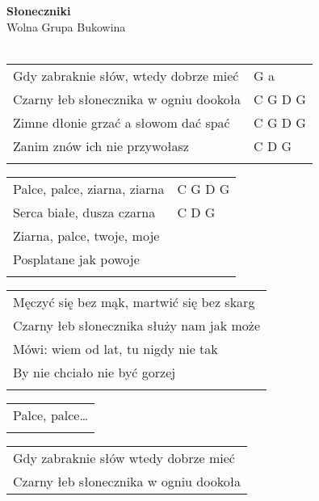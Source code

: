 \documentclass[a5paper]{article}
\begin{document}


\noindent
\fontsize{12pt}{15pt}\selectfont
\textbf{Słoneczniki} \\
\fontsize{8pt}{10pt}\selectfont
Wolna Grupa Bukowina \\ \\
\fontsize{10pt}{12pt}\selectfont
{}
\begin{tabular}{@{}p{8.00cm}p{3cm}@{}}
\noindent
Gdy zabraknie słów, wtedy dobrze mieć & G a \\
Czarny łeb słonecznika w ogniu dookoła & C G D G \\
Zimne dłonie grzać a słowom dać spać	 & C G D G \\
Zanim znów ich nie przywołasz			& C D G \\ \\
\end{tabular}

\noindent
\begin{tabular}{@{}p{7.00cm}p{3cm}@{}}
Palce, palce, ziarna, ziarna & C G D G \\
Serca białe, dusza czarna & C D G \\
Ziarna, palce, twoje, moje & \\
Posplatane jak powoje & \\ \\
\end{tabular}

\noindent
\begin{tabular}{@{}p{8.00cm}@{}}
Męczyć się bez mąk, martwić się bez skarg \\
Czarny łeb słonecznika służy nam jak może \\
Mówi: wiem od lat, tu nigdy nie tak  \\
By nie chciało nie być gorzej \\ \\
\end{tabular}

\noindent
\begin{tabular}{@{}p{7.00cm}@{}}
Palce, palce… \\ \\
\end{tabular}

\noindent
\begin{tabular}{@{}p{8.00cm}@{}}
Gdy zabraknie słów wtedy dobrze mieć \\
Czarny łeb słonecznika w ogniu dookoła
\end{tabular}
\end{document}
